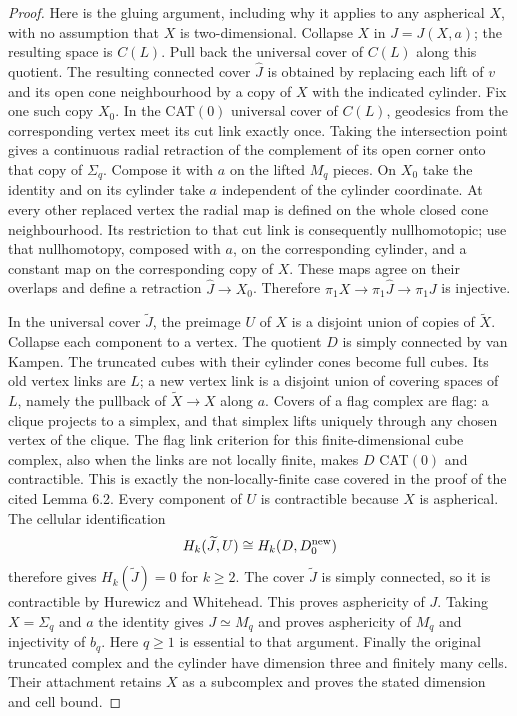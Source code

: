 \begin{proof}
Here is the gluing argument, including why it applies to any
aspherical $X$, with no assumption that $X$ is two-dimensional.
Collapse $X$ in $J=J(X,a)$; the resulting space is $C(L)$.
Pull back the universal cover of $C(L)$ along this quotient.
The resulting connected cover $\widehat J$ is obtained by
replacing each lift of $v$ and its open cone neighbourhood by a
copy of $X$ with the indicated cylinder. Fix one such copy $X_0$.
In the CAT$(0)$ universal cover of $C(L)$, geodesics from the
corresponding vertex meet its cut link exactly once. Taking the
intersection point gives a continuous radial retraction of the
complement of its open corner onto that copy of $\Sigma_q$.
Compose it with $a$ on the lifted $M_q$ pieces. On $X_0$ take the
identity and on its cylinder take $a$ independent of the cylinder
coordinate. At every other replaced vertex the radial map is
defined on the whole closed cone neighbourhood. Its restriction
to that cut link is consequently nullhomotopic; use that
nullhomotopy, composed with $a$, on the corresponding cylinder,
and a constant map on the corresponding copy of $X$.
These maps agree on their overlaps and define a retraction
$\widehat J\to X_0$. Therefore
$\pi_1X\to\pi_1\widehat J\to\pi_1J$ is injective.

In the universal cover $\widetilde J$, the preimage $U$ of $X$
is a disjoint union of copies of $\widetilde X$. Collapse each
component to a vertex. The quotient $D$ is simply connected by
van Kampen. The truncated cubes with their cylinder cones
become full cubes. Its old vertex links are $L$; a new vertex
link is a disjoint union of covering spaces of $L$, namely the
pullback of $\widetilde X\to X$ along $a$. Covers of a flag
complex are flag: a clique projects to a simplex, and that
simplex lifts uniquely through any chosen vertex of the clique.
The flag link criterion for this finite-dimensional cube complex,
also when the links are not locally finite, makes $D$ CAT$(0)$
and contractible. This is exactly the non-locally-finite case
covered in the proof of the cited Lemma 6.2.
Every component of $U$ is contractible because $X$ is aspherical.
The cellular identification
\[
 H_k(\widetilde J,U)\cong H_k(D,D^{\rm new}_0)
\]
therefore gives $H_k(\widetilde J)=0$ for $k\geq2$.
The cover $\widetilde J$ is simply connected, so it is contractible
by Hurewicz and Whitehead. This proves asphericity of $J$.
Taking $X=\Sigma_q$ and $a$ the identity gives
$J\simeq M_q$ and proves asphericity of $M_q$ and injectivity
of $b_q$. Here $q\geq1$ is essential to that argument.
Finally the original truncated complex and the cylinder have
dimension three and finitely many cells. Their attachment retains
$X$ as a subcomplex and proves the stated dimension and cell bound.
\end{proof}


